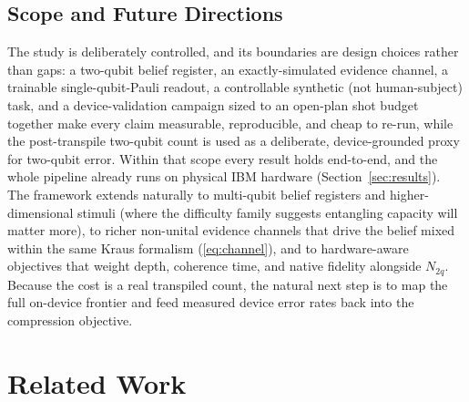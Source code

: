 \documentclass[conference]{IEEEtran}
\begin{document}
\subsection{Scope and Future Directions}

The study is deliberately controlled, and its boundaries are design choices rather than
gaps: a two-qubit belief register, an exactly-simulated evidence channel, a trainable
single-qubit-Pauli readout, a controllable synthetic (not human-subject) task, and a
device-validation campaign sized to an open-plan shot budget together make every claim
measurable, reproducible, and cheap to re-run, while the post-transpile two-qubit count is
used as a deliberate, device-grounded proxy for two-qubit error. Within that scope every
result holds end-to-end, and the whole pipeline already runs on physical IBM hardware
(Section~\ref{sec:results}). The framework extends naturally to multi-qubit belief
registers and higher-dimensional stimuli (where the difficulty family suggests entangling
capacity will matter more), to richer non-unital evidence channels that drive the belief
mixed within the same Kraus formalism (\ref{eq:channel}), and to hardware-aware objectives
that weight depth, coherence time, and native fidelity alongside $N_{2q}$. Because the cost
is a real transpiled count, the natural next step is to map the full on-device frontier and
feed measured device error rates back into the compression objective.

\section{Related Work}
\end{document}
